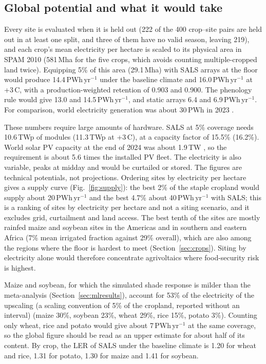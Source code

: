 \subsection{Global potential and what it would take}\label{sec:global}
Every site is evaluated when it is held out (222 of the 400 crop--site pairs are held out in at least one split, and three of them have no valid season, leaving 219), and each crop's mean electricity per hectare is scaled to its physical area in SPAM 2010 (581\,Mha for the five crops, which avoids counting multiple-cropped land twice). Equipping 5\% of this area (29.1\,Mha) with SALS arrays at the floor would produce 14.4\,PWh\,yr$^{-1}$ under the baseline climate and 16.0\,PWh\,yr$^{-1}$ at +3\,\textdegree C, with a production-weighted retention of 0.903 and 0.900. The phenology rule would give 13.0 and 14.5\,PWh\,yr$^{-1}$, and static arrays 6.4 and 6.9\,PWh\,yr$^{-1}$. For comparison, world electricity generation was about 30\,PWh in 2023 \citep{ember2024}.

These numbers require large amounts of hardware. SALS at 5\% coverage needs 10.6\,TWp of modules (11.3\,TWp at +3\,\textdegree C), at a capacity factor of 15.5\% (16.2\%). World solar PV capacity at the end of 2024 was about 1.9\,TW \citep{irena2025}, so the requirement is about 5.6 times the installed PV fleet. The electricity is also variable, peaks at midday and would be curtailed or stored. The figures are technical potentials, not projections. Ordering sites by electricity per hectare gives a supply curve (Fig.~\ref{fig:supply}): the best 2\% of the staple cropland would supply about 20\,PWh\,yr$^{-1}$ and the best 4.7\% about 40\,PWh\,yr$^{-1}$ with SALS; this is a ranking of sites by electricity per hectare and not a siting scenario, and it excludes grid, curtailment and land access. The best tenth of the sites are mostly rainfed maize and soybean sites in the Americas and in southern and eastern Africa (7\% mean irrigated fraction against 29\% overall), which are also among the regions where the floor is hardest to meet (Section~\ref{sec:crops}). Siting by electricity alone would therefore concentrate agrivoltaics where food-security risk is highest.

Maize and soybean, for which the simulated shade response is milder than the meta-analysis (Section~\ref{sec:mlresults}), account for 53\% of the electricity of the upscaling (a scaling convention of 5\% of the cropland, reported without an interval) (maize 30\%, soybean 23\%, wheat 29\%, rice 15\%, potato 3\%). Counting only wheat, rice and potato would give about 7\,PWh\,yr$^{-1}$ at the same coverage, so the global figure should be read as an upper estimate for about half of its content. By crop, the LER of SALS under the baseline climate is 1.20 for wheat and rice, 1.31 for potato, 1.30 for maize and 1.41 for soybean.

